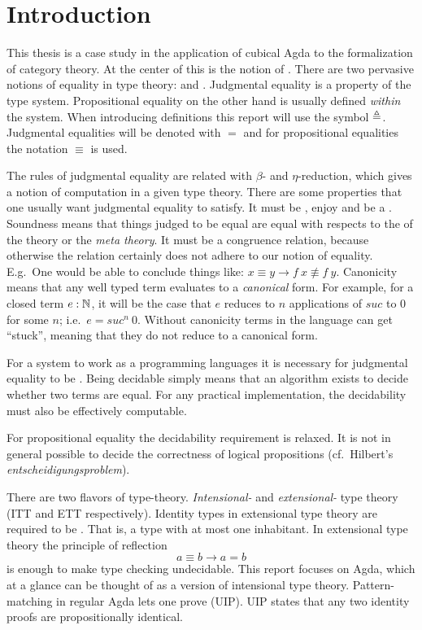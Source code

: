 \chapter{Introduction}
This thesis is a case study in the application of cubical Agda to the
formalization of category theory. At the center of this is the notion
of . There are two pervasive notions of equality
in type theory:  and
. Judgmental equality is a property
of the type system.  Propositional equality on the other hand is
usually defined \emph{within} the system.  When introducing
definitions this report will use the symbol $\mathrel{\triangleq}$.  Judgmental
equalities will be denoted with $=$ and for propositional equalities
the notation $\equiv$ is used.

The rules of judgmental equality are related with $β$- and
$η$-reduction, which gives a notion of computation in a given type
theory.
%
There are some properties that one usually want judgmental equality to
satisfy. It must be , enjoy 
and be a . Soundness means that things
judged to be equal are equal with respects to the 
of the theory or the \emph{meta theory}. It must be a congruence
relation, because otherwise the relation certainly does not adhere to
our notion of equality. E.g.\ One would be able to conclude things
like: $x \equiv y \rightarrow f\ x \nequiv f\ y$. Canonicity means
that any well typed term evaluates to a \emph{canonical} form. For
example, for a closed term $e \mathrel{:} \mathbb{N}$, it will be the case that $e$
reduces to $n$ applications of $\mathit{suc}$ to $0$ for some $n$;
i.e.\ $e = \mathit{suc}^n\ 0$.  Without canonicity terms in the
language can get ``stuck'', meaning that they do not reduce to a
canonical form.

For a system to work as a programming languages it is necessary for
judgmental equality to be . Being decidable
simply means that an algorithm exists to decide whether two terms
are equal.  For any practical implementation, the decidability must
also be effectively computable.

For propositional equality the decidability requirement is relaxed. It
is not in general possible to decide the correctness of logical
propositions (cf.\ Hilbert's \emph{entscheidigungsproblem}).

There are two flavors of type-theory. \emph{Intensional-} and
\emph{extensional-} type theory (ITT and ETT respectively). Identity
types in extensional type theory are required to be
. That is, a type with at most one
inhabitant. In extensional type theory the principle of reflection
%
$$a ≡ b → a = b$$
%
is enough to make type checking undecidable. This report focuses on
Agda, which at a glance can be thought of as a version of intensional
type theory. Pattern-matching in regular Agda lets one prove
 (UIP). UIP states that any
two identity proofs are propositionally identical.

